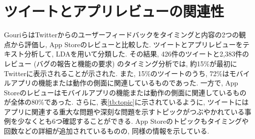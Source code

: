 


\section{ツイートとアプリレビューの関連性}
Gouriら\cite{tweetapp}はTwitterからのユーザーフィードバックをタイミングと内容の2つの観点から評価し, App Storeのレビューと比較した. 
ツイートとアプリレビューをテキスト分析して, LDA\cite{lda}を用いて分類した. その結果, 426件のツイートと2,383件のレビュー (バグの報告と機能の要求)  のタイミング分析では, 約15\%が最初にTwitterに表示されることが示された. 
また, 15\%のツイートのうち, 72\%はモバイルアプリの機能または動作の側面に関連しているものであった. 一方で, App Storeのレビューはモバイルアプリの機能または動作の側面に関連しているものが全体の80\%であった. 
さらに, 表\ref{tb:topic}に示されているように, ツイートにはアプリに関連する重大な問題や深刻な問題を示すトピックがつぶやかれている事例を少なくとも6つ確認することができる. App Storeのトピックもタイミングや回数などの詳細が追加されているものの, 同様の情報を示している. 

